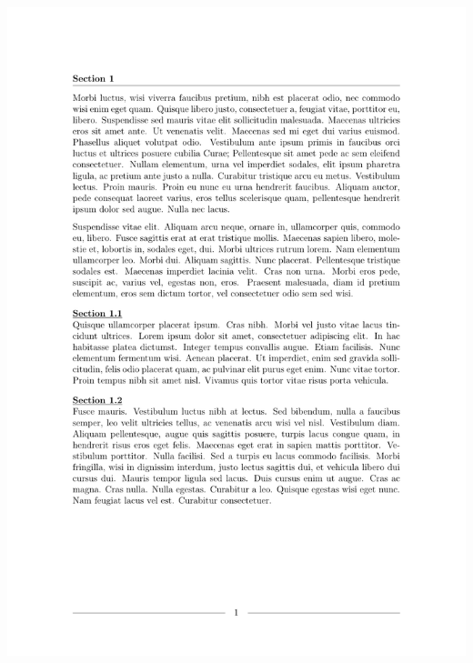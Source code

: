 \centering
\begin{myFIG}{}
	\includegraphics[page=1,scale=0.22]{examples/zz_bsp_file_Headlines.pdf}
\end{myFIG}
\quad

